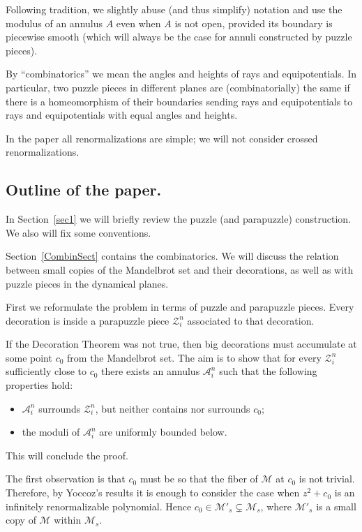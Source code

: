 \documentclass[12pt,a4paper]{amsart}
\newcommand{\MM}{\mathcal M}
\renewcommand{\AA}{\mathcal A}
\newcommand{\ZZ}{\mathcal Z}
\begin{document}
Following tradition, we slightly abuse (and thus simplify) notation
and use the modulus of an annulus $A$ even when $A$ is not open,
provided its boundary is piecewise smooth (which will always be the
case for annuli constructed by puzzle pieces).


By ``combinatorics'' we mean the angles and heights of rays and
equipotentials. In particular, two puzzle pieces in different planes
are (combinatorially) the same if there is a homeomorphism of their
boundaries sending rays and equipotentials to rays and
equipotentials with equal angles and heights.


In the paper all renormalizations are simple; we will not consider
crossed renormalizations.

\subsection{Outline of the paper.}
  In Section~\ref{sec1} we will briefly review the puzzle (and
  parapuzzle)
  construction. We also will fix some conventions.

     Section~\ref{CombinSect} contains the combinatorics. We will
     discuss the relation between small copies of the Mandelbrot set and their decorations, as well as with puzzle
     pieces in the dynamical planes.

     First we reformulate
  the problem in terms of puzzle and parapuzzle pieces. Every
  decoration is inside a parapuzzle piece $\ZZ^n_i$ associated to that decoration.


     If the Decoration Theorem was not true, then
  big decorations must accumulate at some point $c_0$ from the Mandelbrot
  set. The aim is to show that for every $\ZZ^n_i$ sufficiently close to $c_0$
  there exists an annulus $\AA^n_i$ such that the following
  properties hold:
\begin{itemize}
\item $\AA^n_i$ surrounds $\ZZ^n_i$, but neither contains nor surrounds $c_0$;

\item the moduli of $\AA^n_i$ are uniformly bounded below.
\end{itemize}
  This will conclude the proof.

The first observation is that $c_0$ must be so that the fiber of
$\MM$ at $c_0$ is not trivial. Therefore, by Yoccoz's results it is
enough to consider the case when $z^2+c_0$ is an infinitely
renormalizable polynomial. Hence $c_0\in \MM'_s\subsetneq\MM_s$,
where $\MM'_s$ is a small copy of $\MM$ within $\MM_s$.
\end{document}

